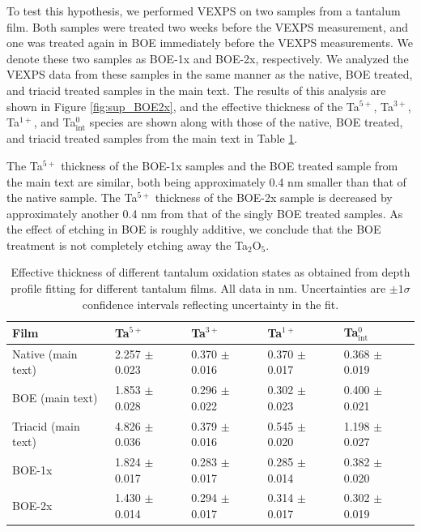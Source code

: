 \documentclass{WileyMSP-template}
\begin{document}
To test this hypothesis, we performed VEXPS on two samples from a tantalum film. Both samples were treated two weeks before the VEXPS measurement, and one was treated again in BOE immediately before the VEXPS measurements. We denote these two samples as BOE-1x and BOE-2x, respectively. We analyzed the VEXPS data from these samples in the same manner as the native, BOE treated, and triacid treated samples in the main text. The results of this analysis are shown in Figure \ref{fig:sup_BOE2x}, and the effective thickness of the Ta$^{5+}$, Ta$^{3+}$, Ta$^{1+}$, and Ta$^{0}_\text{int}$ species are shown along with those of the native, BOE treated, and triacid treated samples from the main text in Table \ref{table:sup_multipleBOE}.

The Ta$^{5+}$ thickness of the BOE-1x samples and the BOE treated sample from the main text are similar, both being approximately 0.4 nm smaller than that of the native sample. The Ta$^{5+}$ thickness of the BOE-2x sample is decreased by approximately another 0.4 nm from that of the singly BOE treated samples. As the effect of etching in BOE is roughly additive, we conclude that the BOE treatment is not completely etching away the Ta$_2$O$_5$.

\begin{table}[h]
 \caption{Effective thickness of different tantalum oxidation states as obtained from depth profile fitting for different tantalum films. All data in nm. Uncertainties are $\pm{}1\sigma{}$ confidence intervals reflecting uncertainty in the fit.}
 \label{table:sup_multipleBOE}
 \centering
 \setlength{\tabcolsep}{10pt}
  \begin{tabular}[htbp]{@{}lllll@{}}
    \hline
    Film & Ta$^{5+}$ & Ta$^{3+}$ & Ta$^{1+}$ & Ta$^{0}_{\text{int}}$ \\
    \hline
    Native (main text) & 2.257 $\pm$ 0.023 & 0.370 $\pm$ 0.016 & 0.370 $\pm$ 0.017 & 0.368 $\pm$ 0.019 \\
    BOE (main text) & 1.853 $\pm$ 0.028 & 0.296 $\pm$ 0.022 & 0.302 $\pm$ 0.023 & 0.400 $\pm$ 0.021\\
    Triacid (main text) & 4.826 $\pm$ 0.036 & 0.379 $\pm$ 0.016 & 0.545 $\pm$ 0.020 & 1.198 $\pm$ 0.027\\
    BOE-1x & 1.824 $\pm$  0.017 & 0.283 $\pm$ 0.017 & 0.285 $\pm$ 0.014 & 0.382 $\pm$ 0.020\\
    BOE-2x & 1.430 $\pm$ 0.014 & 0.294 $\pm$ 0.017 & 0.314 $\pm$ 0.017 & 0.302 $\pm$ 0.019\\
    \hline

  \end{tabular}
\end{table}
\end{document}
